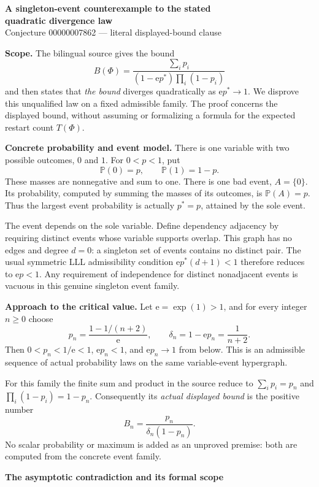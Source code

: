 \documentclass[11pt]{article}
\newcommand{\E}{\mathrm e}
\newcommand{\B}{B}
\begin{document}
\begin{center}
{\Large\bfseries A singleton-event counterexample to the stated\\[3pt]
quadratic divergence law}\\[7pt]
{\small Conjecture 00000007862 --- literal displayed-bound clause}
\end{center}

\textbf{Scope.} The bilingual source gives the bound
\[
 \B(\Phi)=\frac{\sum_i p_i}
 {(1-\E p^*)\prod_i(1-p_i)}
\]
and then states that \emph{the bound} diverges quadratically as
\(\E p^*\to1\). We disprove this unqualified law on a fixed admissible
family. The proof concerns the displayed bound, without assuming or
formalizing a formula for the expected restart count \(T(\Phi)\).

\textbf{Concrete probability and event model.} There is one variable
with two possible outcomes, \(0\) and \(1\). For \(0<p<1\), put
\[
 \mathbb P(0)=p,\qquad \mathbb P(1)=1-p.
\]
These masses are nonnegative and sum to one. There is one bad event,
\(A=\{0\}\). Its probability, computed by summing the masses of its
outcomes, is \(\mathbb P(A)=p\). Thus the largest event probability is
actually \(p^*=p\), attained by the sole event.

The event depends on the sole variable. Define dependency adjacency by
requiring distinct events whose variable supports overlap. This graph
has no edges and degree \(d=0\): a singleton set of events contains no
distinct pair. The usual symmetric LLL admissibility condition
\(\E p^*(d+1)<1\) therefore reduces to \(\E p<1\). Any requirement of
independence for distinct nonadjacent events is vacuous in this genuine
singleton event family.

\textbf{Approach to the critical value.} Let \(\E=\exp(1)>1\), and for
every integer \(n\geq0\) choose
\[
 p_n=\frac{1-1/(n+2)}{\E},\qquad
 \delta_n=1-\E p_n=\frac1{n+2}.
\]
Then \(0<p_n<1/\E<1\), \(\E p_n<1\), and
\(\E p_n\to1\) from below. This is an admissible sequence of actual
probability laws on the same variable-event hypergraph.

For this family the finite sum and product in the source reduce to
\(\sum_i p_i=p_n\) and \(\prod_i(1-p_i)=1-p_n\). Consequently its
\emph{actual displayed bound} is the positive number
\[
 \B_n=\frac{p_n}{\delta_n(1-p_n)}.
\]
No scalar probability or maximum is added as an unproved premise:
both are computed from the concrete event family.

\newpage
\begin{center}
{\large\bfseries The asymptotic contradiction and its formal scope}
\end{center}
\end{document}
